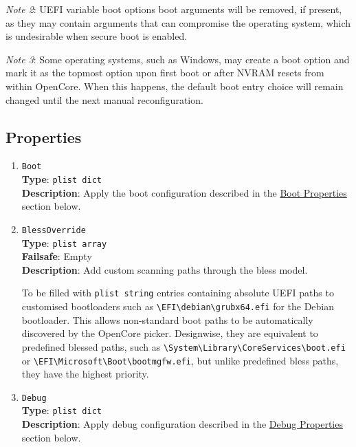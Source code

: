 \documentclass[]{article}
\makeatletter
\renewcommand{\label}[1]{%
\zref@wrapper@immediate{\oldlabel{#1}}}  %
\makeatother
\begin{document}
\emph{Note 2}: UEFI variable boot options boot arguments will be removed, if present, as
they may contain arguments that can compromise the operating system, which is undesirable
when secure boot is enabled.

\emph{Note 3}: Some operating systems, such as Windows, may create a boot option and mark it as
the topmost option upon first boot or after NVRAM resets from within OpenCore. When this happens,
the default boot entry choice will remain changed until the next manual reconfiguration.

\subsection{Properties}\label{miscprops}

\begin{enumerate}
\item
  \texttt{Boot}\\
  \textbf{Type}: \texttt{plist\ dict}\\
  \textbf{Description}: Apply the boot configuration described in the
  \hyperref[miscbootprops]{Boot Properties} section below.

\item
  \texttt{BlessOverride}\\
  \textbf{Type}: \texttt{plist\ array}\\
  \textbf{Failsafe}: Empty\\
  \textbf{Description}: Add custom scanning paths through the bless model.

  To be filled with \texttt{plist\ string} entries containing
  absolute UEFI paths to customised bootloaders such as
  \texttt{\textbackslash EFI\textbackslash debian\textbackslash grubx64.efi}
  for the Debian bootloader. This allows non-standard boot paths to be automatically
  discovered by the OpenCore picker. Designwise, they are equivalent to predefined blessed paths, such as
  \texttt{\textbackslash System\textbackslash Library\textbackslash CoreServices\textbackslash boot.efi}
  or \texttt{\textbackslash EFI\textbackslash Microsoft\textbackslash Boot\textbackslash bootmgfw.efi},
  but unlike predefined bless paths, they have the highest priority.

\item
  \texttt{Debug}\\
  \textbf{Type}: \texttt{plist\ dict}\\
  \textbf{Description}: Apply debug configuration described in the
  \hyperref[miscdebugprops]{Debug Properties} section below.


\end{enumerate}
\end{document}
